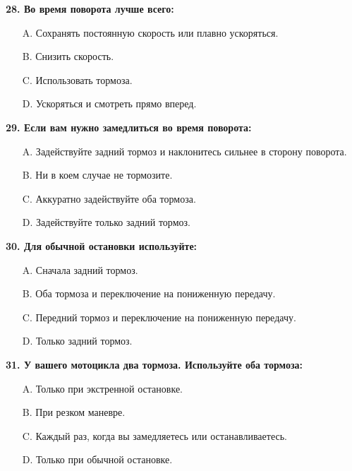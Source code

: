 \begin{minipage}{\linewidth}
\vspace{1em}\noindent\textbf{28. Во время поворота лучше всего:}

\begin{itemize}[nosep,leftmargin=2em]
\item [A.] Сохранять постоянную скорость или плавно ускоряться.
\item [B.] Снизить скорость.
\item [C.] Использовать тормоза.
\item [D.] Ускоряться и смотреть прямо вперед.

\end{itemize}
\end{minipage}


\begin{minipage}{\linewidth}
\vspace{1em}\noindent\textbf{29. Если вам нужно замедлиться во время поворота:}

\begin{itemize}[nosep,leftmargin=2em]
\item [A.] Задействуйте задний тормоз и наклонитесь сильнее в сторону поворота.
\item [B.] Ни в коем случае не тормозите.
\item [C.] Аккуратно задействуйте оба тормоза.
\item [D.] Задействуйте только задний тормоз.

\end{itemize}
\end{minipage}


\begin{minipage}{\linewidth}
\vspace{1em}\noindent\textbf{30. Для обычной остановки используйте:}

\begin{itemize}[nosep,leftmargin=2em]
\item [A.] Сначала задний тормоз.
\item [B.] Оба тормоза и переключение на пониженную передачу.
\item [C.] Передний тормоз и переключение на пониженную передачу.
\item [D.] Только задний тормоз.

\end{itemize}
\end{minipage}


\begin{minipage}{\linewidth}
\vspace{1em}\noindent\textbf{31. У вашего мотоцикла два тормоза. Используйте оба тормоза:}

\begin{itemize}[nosep,leftmargin=2em]
\item [A.] Только при экстренной остановке.
\item [B.] При резком маневре.
\item [C.] Каждый раз, когда вы замедляетесь или останавливаетесь.
\item [D.] Только при обычной остановке.

\end{itemize}
\end{minipage}



